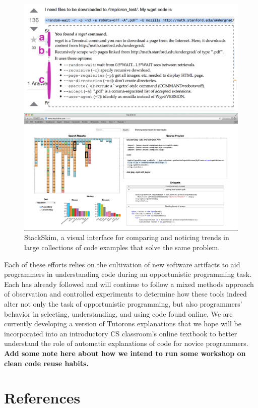 \documentclass[12pt]{memoir}
\begin{document}
\begin{figure}%
  \centering
  \parbox{.45\textwidth}{%
    \includegraphics[width=\linewidth]{figures/tutorons_microexplanation}
    \caption{%
      A micro-explanation for a command line generated by a Tutoron with multiple levels of detail 
      (definition, high-level intent, arguments)
    }\label{fig:tutorons_microexplanation}
  }%
  \qquad
  \parbox{.45\textwidth}{%
    \includegraphics[width=\linewidth]{figures/stackskim_ui}
    \caption{%
      StackSkim, a visual interface for comparing and noticing trends in large collections of code examples that solve the same problem.
    }\label{fig:stackskim_ui}
  }
\end{figure}

Each of these efforts relies on the cultivation of new software artifacts to aid programmers in understanding code during an opportunistic programming task.
Each has already followed and will continue to follow a mixed methods approach of observation and controlled experiments to determine how these tools indeed alter not only the task of opportunistic programming, but also programmers' behavior in selecting, understanding, and using code found online.
We are currently developing a version of Tutorons explanations that we hope will be incorporated into an introductory CS classroom's online textbook to better understand the role of automatic explanations of code for novice programmers.
\textbf{Add some note here about how we intend to run some workshop on clean code reuse habits.}

\section{References}
\printbibliography[heading=none]
\end{document}
